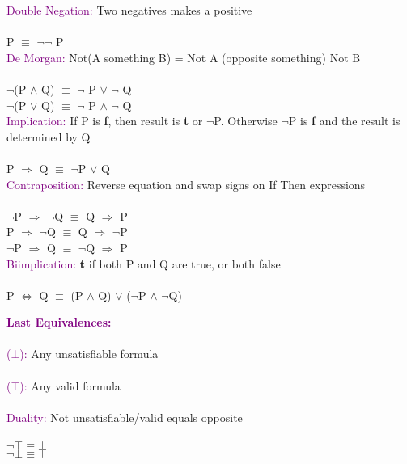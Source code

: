 \documentclass[a4paper,10pt]{article}
\begin{document}
\indent \textcolor{Purple}{Double Negation:} Two negatives makes a positive \\ \\
\indent \indent P $\equiv$ $\neg \neg$ P \\

\indent \textcolor{Purple}{De Morgan:} Not(A something B) = Not A (opposite something) Not B\\ \\
\indent \indent $\neg$(P $\land$ Q) $\equiv$ $\neg$ P $\lor$ $\neg$ Q \\
\indent \indent $\neg$(P $\lor$ Q) $\equiv$ $\neg$ P $\land$ $\neg$ Q \\

\indent \textcolor{Purple}{Implication:} If P is \textbf{f}, then result is \textbf{t} or $\neg$P. Otherwise $\neg$P is \textbf{f} and the result is determined by Q \\ \\
\indent \indent P $\Rightarrow$ Q $\equiv$ $\neg$P $\lor$ Q \\

\indent \textcolor{Purple}{Contraposition:} Reverse equation and swap signs on If Then expressions\\ \\
\indent \indent $\neg$P $\Rightarrow$ $\neg$Q $\equiv$ Q $\Rightarrow$ P \\
\indent \indent P $\Rightarrow$ $\neg$Q $\equiv$ Q $\Rightarrow$ $\neg$P \\
\indent \indent $\neg$P $\Rightarrow$ Q $\equiv$ $\neg$Q $\Rightarrow$ P \\

\indent \textcolor{Purple}{Biimplication:} \textbf{t} if both P and Q are true, or both false\\ \\
\indent \indent P $\Leftrightarrow$ Q $\equiv$ (P $\land$ Q) $\lor$ ($\neg$P  $\land$ $\neg$Q)

\newpage
\noindent \textcolor{Purple}{\textbf{Last Equivalences:}} \\ \\
\indent \textcolor{Purple}{($\bot$):} Any unsatisfiable formula\\ \\
\indent \textcolor{Purple}{($\top$):} Any valid formula\\ \\
\indent \textcolor{Purple}{Duality:} Not unsatisfiable/valid equals opposite\\ \\
\indent \indent $\neg \top \equiv \bot$ \\
\indent \indent $\neg \bot \equiv \top$ \\
\end{document}
